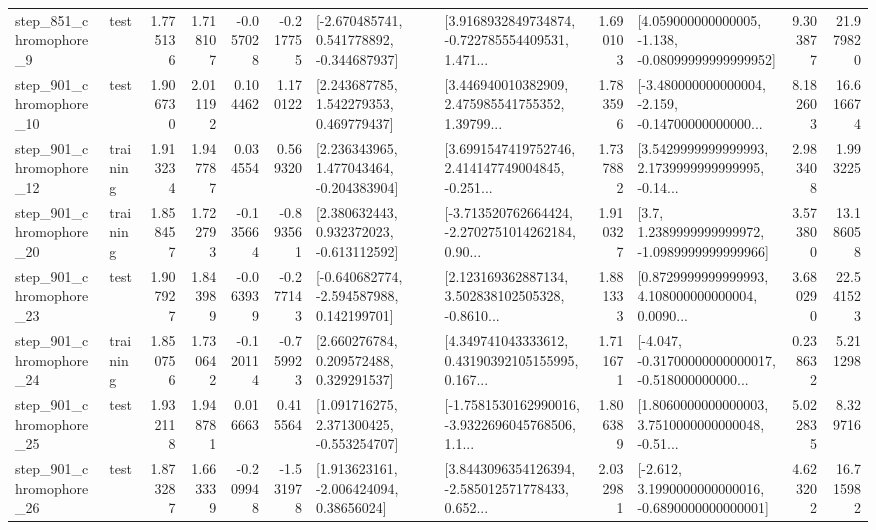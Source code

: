 \begin{tabular}{llrrrrllrlrr}
   step\_851\_chromophore\_9 &      test &      1.775136 &    1.718107 &     -0.057028 & -0.217755 &   [-2.670485741, 0.541778892, -0.344687937] &  [3.9168932849734874, -0.722785554409531, 1.471... &       1.690103 &  [4.059000000000005, -1.138, -0.08099999999999952] &            9.303877 &         21.979820 \\
  step\_901\_chromophore\_10 &      test &      1.906730 &    2.011192 &      0.104462 &  1.170122 &     [2.243687785, 1.542279353, 0.469779437] &  [3.446940010382909, 2.475985541755352, 1.39799... &       1.783596 &  [-3.480000000000004, -2.159, -0.14700000000000... &            8.182603 &         16.616674 \\
  step\_901\_chromophore\_12 &  training &      1.913234 &    1.947787 &      0.034554 &  0.569320 &    [2.236343965, 1.477043464, -0.204383904] &  [3.6991547419752746, 2.414147749004845, -0.251... &       1.737882 &  [3.5429999999999993, 2.1739999999999995, -0.14... &            2.983408 &          1.993225 \\
  step\_901\_chromophore\_20 &  training &      1.858457 &    1.722793 &     -0.135664 & -0.893561 &    [2.380632443, 0.932372023, -0.613112592] &  [-3.713520762664424, -2.2702751014262184, 0.90... &       1.910327 &     [3.7, 1.2389999999999972, -1.0989999999999966] &            3.573800 &         13.186058 \\
  step\_901\_chromophore\_23 &      test &      1.907927 &    1.843989 &     -0.063939 & -0.277143 &   [-0.640682774, -2.594587988, 0.142199701] &  [2.123169362887134, 3.502838102505328, -0.8610... &       1.881333 &  [0.8729999999999993, 4.108000000000004, 0.0090... &            3.680290 &         22.541523 \\
  step\_901\_chromophore\_24 &  training &      1.850756 &    1.730642 &     -0.120114 & -0.759923 &     [2.660276784, 0.209572488, 0.329291537] &  [4.349741043333612, 0.43190392105155995, 0.167... &       1.711671 &  [-4.047, -0.31700000000000017, -0.518000000000... &            0.238632 &          5.211298 \\
  step\_901\_chromophore\_25 &      test &      1.932118 &    1.948781 &      0.016663 &  0.415564 &    [1.091716275, 2.371300425, -0.553254707] &  [-1.7581530162990016, -3.9322696045768506, 1.1... &       1.806389 &  [1.8060000000000003, 3.7510000000000048, -0.51... &            5.022835 &          8.329716 \\
  step\_901\_chromophore\_26 &      test &      1.873287 &    1.663339 &     -0.209948 & -1.531978 &     [1.913623161, -2.006424094, 0.38656024] &  [3.8443096354126394, -2.585012571778433, 0.652... &       2.032981 &  [-2.612, 3.1990000000000016, -0.6890000000000001] &            4.623202 &         16.715982 \\

\end{tabular}

